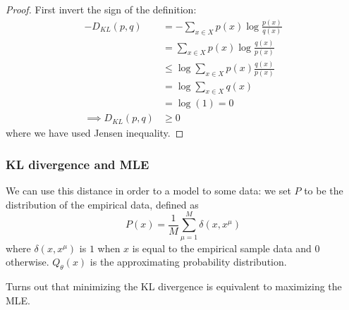 \documentclass[12pt]{extarticle}
\begin{document}
\begin{proof}
	First invert the sign of the definition:
	\begin{align}
		-D_{KL}(p,q)          & = -\sum_{x \in X} p(x) \log \frac{p(x)}{q(x)}   \\
		                      & = \sum_{x \in X} p(x) \log \frac{q(x)}{p(x)}    \\
		                      & \leq \log \sum_{x \in X} p(x) \frac{q(x)}{p(x)} \\
		                      & = \log \sum_{x \in X} q(x)                      \\
		                      & = \log (1) = 0                                  \\
		\implies D_{KL}(p, q) & \geq 0
	\end{align}
	where we have used Jensen inequality.
\end{proof}

\subsubsection{KL divergence and MLE}

We can use this distance in order to  a model to some data:
we set $P$ to be the distribution of the empirical data, defined as
\begin{equation}
	P(x) = \frac{1}{M} \sum^M_{\mu = 1} \delta(x, x^\mu)
\end{equation}
where $\delta(x, x^\mu)$ is $1$ when $x$ is equal to the empirical sample data and $0$ otherwise.
$Q_\theta(x)$ is the approximating probability distribution.

Turns out that minimizing the KL divergence is equivalent to maximizing the MLE.
\end{document}
